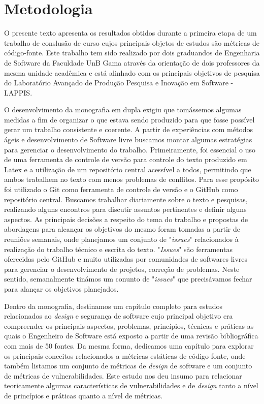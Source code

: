 \section{Metodologia}
\label{sec:methodology}

O presente texto apresenta os resultados obtidos durante a primeira etapa de um trabalho de conslusão de curso cujos principais objetos de estudos são métricas de código-fonte. Este trabalho tem sido realizado por dois graduandos de Engenharia de Software da Faculdade UnB Gama através da orientação de dois professores da mesma unidade acadêmica e está alinhado com os principais objetivos de pesquisa do Laboratório Avançado de Produção Pesquisa e Inovação em Software - LAPPIS. 

O desenvolvimento da monografia em dupla exigiu que tomássemos algumas medidas a fim de organizar o que estava sendo produzido para que fosse possível gerar um trabalho consistente e coerente. A partir de experiências com métodos ágeis e desenvolvimento de Software livre buscamos montar algumas estratégias para gerenciar o desenvolvimento do trabalho. Primeiramente, foi essencial o uso de uma ferramenta de controle de versão para controle do texto produzido em Latex e a utilização de um repositório central acessível a todos, permitindo que ambos trabalhem no texto com menos problemas de conflitos. Para esse propósito foi utilizado o Git como ferramenta de controle de versão e o GitHub como repositório central. Buscamos trabalhar diariamente sobre o texto e pesquisas, realizando alguns encontros para discutir assuntos pertinentes e definir alguns aspectos. As principais decisões a respeito do tema do trabalho e propostas de abordagens para alcançar os objetivos do mesmo foram tomadas a partir de reuniões semanais, onde planejamos um conjunto de "\emph{issues}" relacionados à realização do trabalho técnico e escrita do texto. "\emph{Issues}" são ferramentas oferecidas pelo GitHub e muito utilizadas por comunidades de softwares livres para gerenciar o desenvolvimento de projetos, correção de problemas. Neste sentido, semanalmente tinámos um conunto de "\emph{issues}" que precisávamos fechar para alançar os objetivos planejados.

Dentro da monografia, destinamos um capítulo completo para estudos relacionados ao \emph{design} e segurança de software cujo principal objetivo era compreender os principais aspectos, problemas, princípios, técnicas e práticas as quais o Engenheiro de Software está exposto a partir de uma revisão bibliográfica com mais de 50 fontes. Da mesma forma, dedicamos uma capítulo para explorar os principais conceitos relacionados a métricas estáticas de código-fonte, onde também listamos um conjunto de métricas de \emph{design} de software e um conjunto de métricas de vulnerabilidades. Este estudo nos deu insumo para relacionar teoricamente algumas características de vulnerabilidades e de \emph{design} tanto a nível de princípios e práticas quanto a nível de métricas.

